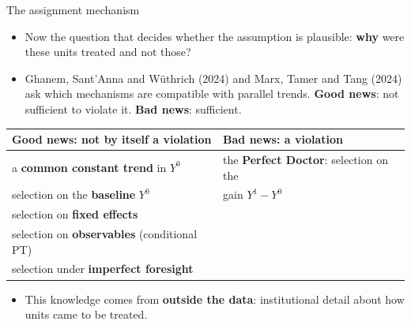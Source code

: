 \documentclass[
  11pt,
  ignorenonframetext,
  aspectratio=169,
]{beamer}
\providecommand{\tightlist}{%
  \setlength{\itemsep}{0pt}\setlength{\parskip}{0pt}}
\begin{document}
\begin{frame}{The assignment mechanism}
\protect{}\label{the-assignment-mechanism}
\begin{itemize}
\tightlist
\item
  Now the question that decides whether the assumption is plausible:
  \textbf{why} were these units treated and not those?
\item
  Ghanem, Sant'Anna and Wüthrich (2024) and Marx, Tamer and Tang (2024)
  ask which mechanisms are compatible with parallel trends. \textbf{Good
  news}: not sufficient to violate it. \textbf{Bad news}: sufficient.
\end{itemize}

\begin{center}\footnotesize
\begin{tabular}{R{7.2cm}R{5.4cm}}
\toprule
Good news: not by itself a violation & Bad news: a violation \\
\midrule
a \textbf{common constant trend} in $Y^0$ & the \textbf{Perfect Doctor}: selection on the \\
selection on the \textbf{baseline} $Y^0$ & \quad gain $Y^1 - Y^0$  \\
selection on \textbf{fixed effects} &  \\
selection on \textbf{observables} (conditional PT) & \\
selection under \textbf{imperfect foresight} & \\
\bottomrule
\end{tabular}
\end{center}

\begin{itemize}
\tightlist
\item
  This knowledge comes from \textbf{outside the data}: institutional
  detail about how units came to be treated.
\end{itemize}
\end{frame}
\end{document}
